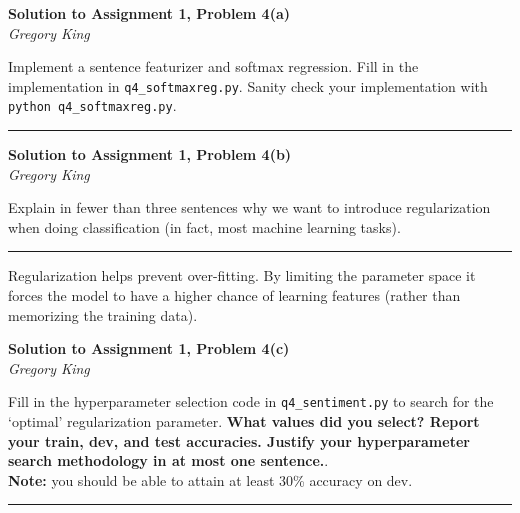 \documentclass[letter,12pt]{article}
\newcommand{\myhwtitle}[3]
{\begin{center}
{\large {\bf Solution to Assignment {#1}, Problem {#2}}}\\
\medskip
{\it {#3}} %
\end{center}}
\newcommand{\solutionsAuthor}{Gregory King}
\begin{document}
\myhwtitle{1}{4(a)}{\solutionsAuthor}

\bigskip
\noindent Implement a sentence featurizer and softmax regression. Fill in the implementation in \texttt{q4\_softmaxreg.py}. Sanity check your implementation with \texttt{python q4\_softmaxreg.py}.\vspace{5mm}

\noindent\rule{\textwidth}{0.4pt}\vspace{5mm}

\clearpage

\myhwtitle{1}{4(b)}{\solutionsAuthor}
\bigskip
\noindent Explain in fewer than three sentences why we want to introduce regularization when doing classification (in fact, most machine learning tasks).\vspace{5mm}

\noindent\rule{\textwidth}{0.4pt}\vspace{5mm}
Regularization helps prevent over-fitting. By limiting the parameter space it forces the model to have a higher chance of learning features (rather than memorizing the training data).
\clearpage

\myhwtitle{1}{4(c)}{\solutionsAuthor}

\bigskip
\noindent Fill in the hyperparameter selection code in \texttt{q4\_sentiment.py} to search for the `optimal' regularization parameter. \textbf{What values did you select? Report your train, dev, and test accuracies. Justify your hyperparameter search methodology in at most one sentence.}. \\

\noindent\textbf{Note:} you should be able to attain at least 30\% accuracy on dev.\vspace{5mm}

\noindent\rule{\textwidth}{0.4pt}\vspace{5mm}
\end{document}
